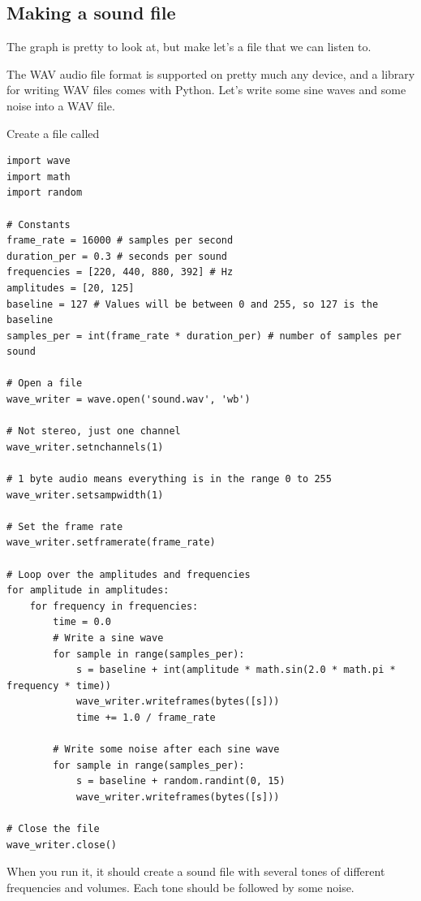 \subsection{Making a sound file}

The graph is pretty to look at, but make let's a file that we can listen to.

The WAV audio file format is supported on pretty much any device, and
a library for writing WAV files comes with Python. Let's write some
sine waves and some noise into a WAV file.

Create a file called 

\begin{Verbatim}
import wave
import math
import random

# Constants
frame_rate = 16000 # samples per second
duration_per = 0.3 # seconds per sound
frequencies = [220, 440, 880, 392] # Hz
amplitudes = [20, 125]
baseline = 127 # Values will be between 0 and 255, so 127 is the baseline
samples_per = int(frame_rate * duration_per) # number of samples per sound

# Open a file
wave_writer = wave.open('sound.wav', 'wb')

# Not stereo, just one channel
wave_writer.setnchannels(1)

# 1 byte audio means everything is in the range 0 to 255
wave_writer.setsampwidth(1)

# Set the frame rate
wave_writer.setframerate(frame_rate)

# Loop over the amplitudes and frequencies
for amplitude in amplitudes:
    for frequency in frequencies:
        time = 0.0
        # Write a sine wave
        for sample in range(samples_per):
            s = baseline + int(amplitude * math.sin(2.0 * math.pi * frequency * time))
            wave_writer.writeframes(bytes([s]))
            time += 1.0 / frame_rate
            
        # Write some noise after each sine wave
        for sample in range(samples_per):
            s = baseline + random.randint(0, 15)
            wave_writer.writeframes(bytes([s]))
            
# Close the file
wave_writer.close()
\end{Verbatim}

When you run it, it should create a sound file with several tones of
different frequencies and volumes. Each tone should be followed by
some noise.
